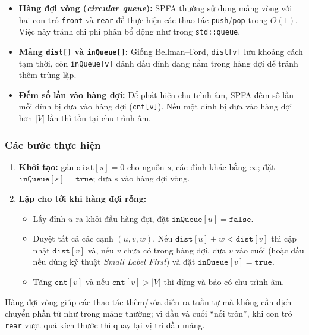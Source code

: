 \documentclass[14pt,a4paper]{report}
\begin{document}
\begin{itemize}
    \item \textbf{Hàng đợi vòng (\textit{circular queue}):} SPFA thường sử dụng mảng vòng với hai con trỏ \texttt{front} và \texttt{rear} để thực hiện các thao tác \texttt{push}/\texttt{pop} trong $O(1)$. Việc này tránh chi phí phân bổ động như trong \texttt{std::queue}.
    \item \textbf{Mảng \texttt{dist[]} và \texttt{inQueue[]}:} Giống Bellman--Ford, \texttt{dist[v]} lưu khoảng cách tạm thời, còn \texttt{inQueue[v]} đánh dấu đỉnh đang nằm trong hàng đợi để tránh thêm trùng lặp.
    \item \textbf{Đếm số lần vào hàng đợi:} Để phát hiện chu trình âm, SPFA đếm số lần mỗi đỉnh bị đưa vào hàng đợi (\texttt{cnt[v]}). Nếu một đỉnh bị đưa vào hàng đợi hơn $|V|$ lần thì tồn tại chu trình âm.
\end{itemize}

\subsubsection{Các bước thực hiện}

\begin{enumerate}
    \item \textbf{Khởi tạo:} gán $\texttt{dist}[s] = 0$ cho nguồn $s$, các đỉnh khác bằng $\infty$; đặt $\texttt{inQueue}[s] = \texttt{true}$; đưa $s$ vào hàng đợi vòng.
    \item \textbf{Lặp cho tới khi hàng đợi rỗng:}
    \begin{itemize}
        \item Lấy đỉnh $u$ ra khỏi đầu hàng đợi, đặt $\texttt{inQueue}[u] = \texttt{false}$.
        \item Duyệt tất cả các cạnh $(u,v,w)$. Nếu $\texttt{dist}[u] + w < \texttt{dist}[v]$ thì cập nhật $\texttt{dist}[v]$ và, nếu $v$ chưa có trong hàng đợi, đưa $v$ vào cuối (hoặc đầu nếu dùng kỹ thuật \textit{Small Label First}) và đặt $\texttt{inQueue}[v] = \texttt{true}$.
        \item Tăng $\texttt{cnt}[v]$ và nếu $\texttt{cnt}[v] > |V|$ thì dừng và báo có chu trình âm.
    \end{itemize}
\end{enumerate}

Hàng đợi vòng giúp các thao tác thêm/xóa diễn ra tuần tự mà không cần dịch chuyển phần tử như trong mảng thường; vì đầu và cuối ``nối tròn'', khi con trỏ \texttt{rear} vượt quá kích thước thì quay lại vị trí đầu mảng.
\end{document}
